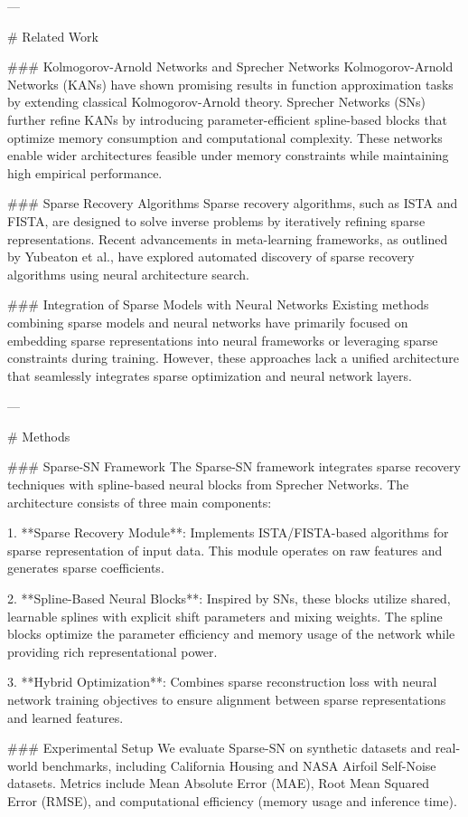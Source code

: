 ---

# Related Work  

### Kolmogorov-Arnold Networks and Sprecher Networks  
Kolmogorov-Arnold Networks (KANs) have shown promising results in function approximation tasks by extending classical Kolmogorov-Arnold theory. Sprecher Networks (SNs) further refine KANs by introducing parameter-efficient spline-based blocks that optimize memory consumption and computational complexity. These networks enable wider architectures feasible under memory constraints while maintaining high empirical performance. 

### Sparse Recovery Algorithms  
Sparse recovery algorithms, such as ISTA and FISTA, are designed to solve inverse problems by iteratively refining sparse representations. Recent advancements in meta-learning frameworks, as outlined by Yubeaton et al., have explored automated discovery of sparse recovery algorithms using neural architecture search.

### Integration of Sparse Models with Neural Networks  
Existing methods combining sparse models and neural networks have primarily focused on embedding sparse representations into neural frameworks or leveraging sparse constraints during training. However, these approaches lack a unified architecture that seamlessly integrates sparse optimization and neural network layers.

---

# Methods  

### Sparse-SN Framework  
The Sparse-SN framework integrates sparse recovery techniques with spline-based neural blocks from Sprecher Networks. The architecture consists of three main components:

1. **Sparse Recovery Module**: Implements ISTA/FISTA-based algorithms for sparse representation of input data. This module operates on raw features and generates sparse coefficients.
   
2. **Spline-Based Neural Blocks**: Inspired by SNs, these blocks utilize shared, learnable splines with explicit shift parameters and mixing weights. The spline blocks optimize the parameter efficiency and memory usage of the network while providing rich representational power.

3. **Hybrid Optimization**: Combines sparse reconstruction loss with neural network training objectives to ensure alignment between sparse representations and learned features.

### Experimental Setup  
We evaluate Sparse-SN on synthetic datasets and real-world benchmarks, including California Housing and NASA Airfoil Self-Noise datasets. Metrics include Mean Absolute Error (MAE), Root Mean Squared Error (RMSE), and computational efficiency (memory usage and inference time).

